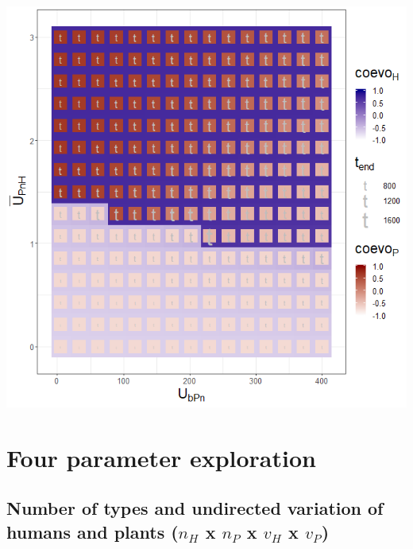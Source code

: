 \documentclass[
]{book}
\begin{document}
\includegraphics[width=1\linewidth]{plots/3_twoPar-U.bPn-mU.PnH_plot}

\newpage

\hypertarget{four-parameter-exploration}{%
\chapter{Four parameter exploration}\label{four-parameter-exploration}}

\newpage

\hypertarget{number-of-types-and-undirected-variation-of-humans-and-plants-n_h-x-n_p-x-v_h-x-v_p}{%
\section{\texorpdfstring{Number of types and undirected variation of humans and plants (\(n_{H}\) x \(n_{P}\) x \(v_{H}\) x \(v_{P}\))}{Number of types and undirected variation of humans and plants (n\_\{H\} x n\_\{P\} x v\_\{H\} x v\_\{P\})}}\label{number-of-types-and-undirected-variation-of-humans-and-plants-n_h-x-n_p-x-v_h-x-v_p}}

\end{document}
